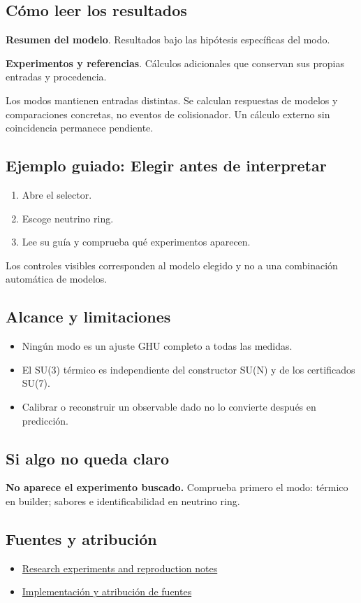 \documentclass[11pt,a4paper]{article}
\begin{document}
\subsection*{Cómo leer los resultados}
\textbf{Resumen del modelo}. Resultados bajo las hipótesis específicas del modo.

\textbf{Experimentos y referencias}. Cálculos adicionales que conservan sus propias entradas y procedencia.

Los modos mantienen entradas distintas. Se calculan respuestas de modelos y comparaciones concretas, no eventos de colisionador. Un cálculo externo sin coincidencia permanece pendiente.
\subsection*{Ejemplo guiado: Elegir antes de interpretar}
\begin{enumerate}
\item Abre el selector.
\item Escoge neutrino ring.
\item Lee su guía y comprueba qué experimentos aparecen.
\end{enumerate}
Los controles visibles corresponden al modelo elegido y no a una combinación automática de modelos.
\subsection*{Alcance y limitaciones}
\begin{itemize}
\item Ningún modo es un ajuste GHU completo a todas las medidas.
\item El SU(3) térmico es independiente del constructor SU(N) y de los certificados SU(7).
\item Calibrar o reconstruir un observable dado no lo convierte después en predicción.
\end{itemize}
\subsection*{Si algo no queda claro}
\textbf{No aparece el experimento buscado.} Comprueba primero el modo: térmico en builder; sabores e identificabilidad en neutrino ring.

\subsection*{Fuentes y atribución}
\begin{itemize}
\item \href{https://github.com/karlesmarin/ghu-lab/blob/main/docs/research-extensions.md}{Research experiments and reproduction notes}
\item \href{https://github.com/karlesmarin/ghu-lab/blob/main/src/sections/predict_section.js}{Implementación y atribución de fuentes}
\end{itemize}
\end{document}
